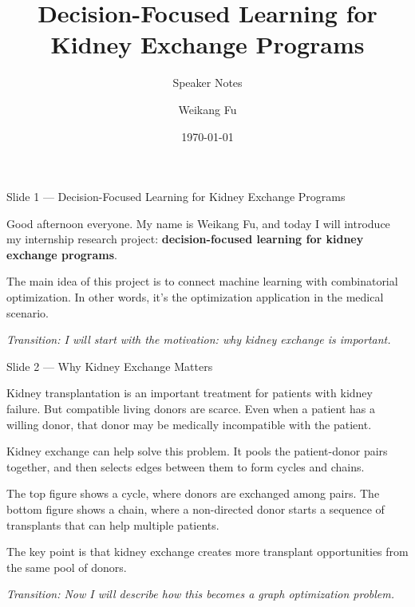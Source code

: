 \documentclass[11pt, aspectratio=169]{beamer}
\title{\textbf{Decision-Focused Learning for Kidney Exchange Programs}}
\subtitle{Speaker Notes}
\author{Weikang Fu}
\date{\today}
\newcommand{\kw}[1]{\textcolor{navyblue}{\textbf{#1}}}
\newcommand{\tr}[1]{\vspace{0.35em}\textit{\textcolor{black!55}{Transition: #1}}}
\newcommand{\timing}[1]{}
\begin{document}
\begin{frame}{Slide 1 \enspace\textmd{\small\textcolor{black!40}{--- Decision-Focused Learning for Kidney Exchange Programs}}}
\small
\timing{15 seconds}

Good afternoon everyone. My name is Weikang Fu, and today I will introduce my
internship research project: \kw{decision-focused learning for kidney exchange
programs}.

\vspace{0.35em}
The main idea of this project is to connect machine learning with combinatorial
optimization. In other words, it's the optimization application in the medical
scenario.

\tr{I will start with the motivation: why kidney exchange is important.}
\end{frame}

\begin{frame}{Slide 2 \enspace\textmd{\small\textcolor{black!40}{--- Why Kidney Exchange Matters}}}
\small
\timing{40 seconds}

Kidney transplantation is an important treatment for patients with kidney
failure. But compatible living donors are scarce. Even when a patient has a
willing donor, that donor may be medically incompatible with the patient.

\vspace{0.35em}
Kidney exchange can help solve this problem. It pools the patient-donor
pairs together, and then selects edges between them to form cycles and chains.

\vspace{0.35em}
The top figure shows a cycle, where donors are exchanged among pairs. The
bottom figure shows a chain, where a non-directed donor starts a sequence of
transplants that can help multiple patients.

\vspace{0.35em}
The key point is that kidney exchange creates more transplant opportunities from
the same pool of donors.

\tr{Now I will describe how this becomes a graph optimization problem.}
\end{frame}
\end{document}
